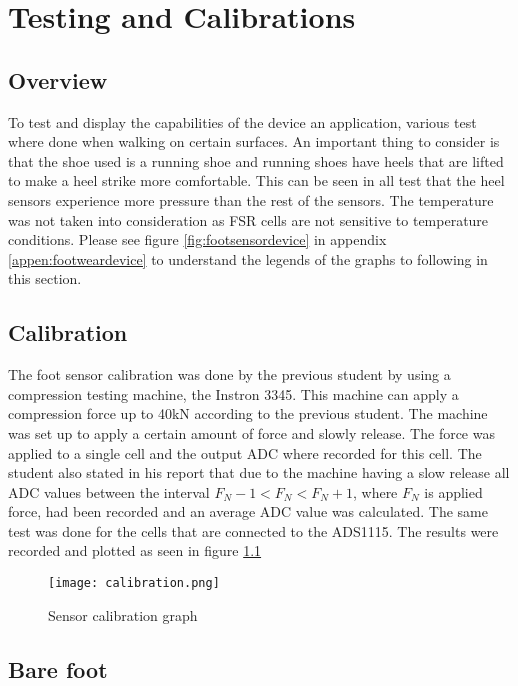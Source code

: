 \graphicspath{{testingandcal/fig/}}

\chapter{Testing and Calibrations}
\label{chap:testing}

\section{Overview}
\label{sec:testingoverview}

To test and display the capabilities of the device an application, various test where done when walking on certain surfaces. An important thing to consider is that the shoe used is a running shoe and running shoes have heels that are lifted to make a heel strike more comfortable. This can be seen in all test that the heel sensors experience more pressure than the rest of the sensors. The temperature was not taken into consideration as FSR cells are not sensitive to temperature conditions. Please see figure \ref{fig:footsensordevice} in appendix \ref{appen:footweardevice} to understand the legends of the graphs to following in this section.

\section{Calibration}
\label{sec:calibration}

The foot sensor calibration was done by the previous student  by using a compression testing machine, the Instron 3345. This machine can apply a compression force up to 40kN according to the previous student. The machine was set up to apply a certain amount of force and slowly release. The force was applied to a single cell and the output ADC where recorded for this cell. The student also stated in his report that due to the machine having a slow release all ADC values between the interval $F_N - 1 < F_N < F_N + 1$, where $F_N$ is applied force, had been recorded and an average ADC value was calculated. The same test was done for the cells that are connected to the ADS1115. The results were recorded and plotted as seen in figure \ref{fig:calibration}
\clearpage
\begin{figure}[!htb]
    \centering
    \texttt{[image: calibration.png]}
    \caption{Sensor calibration graph}
    \label{fig:calibration}
\end{figure}

\section{Bare foot}

